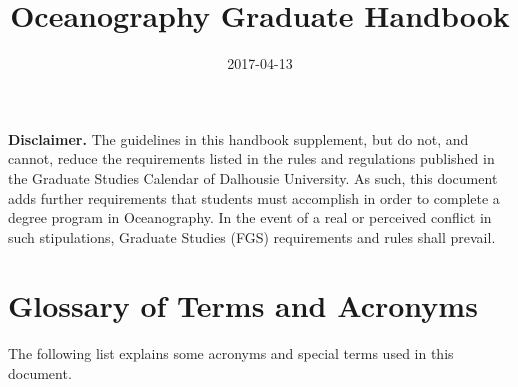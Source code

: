 \documentclass[12pt]{article}
\title{Oceanography Graduate Handbook}
\author{}
\date{2017-04-13}
\newcommand{\FGS}{FGS\xspace}
\begin{document}
\clearpage
\maketitle
\thispagestyle{empty}

\textbf{Disclaimer.} The guidelines in this handbook supplement, but do not,
and cannot, reduce the requirements listed in the rules and regulations
published in the Graduate Studies Calendar of Dalhousie University.  As such,
this document adds further requirements that students must accomplish in order
to complete a degree program in Oceanography.  In the event of a real or
perceived conflict in such stipulations, Graduate Studies (\FGS) requirements
and rules shall prevail.


\newpage

\renewcommand{\baselinestretch}{0.5}\normalsize


\setcounter{tocdepth}{2}
\tableofcontents

\thispagestyle{empty}
\renewcommand{\baselinestretch}{1.0}\normalsize

\setcounter{page}{0}

\section{\label{sec:glossary}Glossary of Terms and Acronyms}

The following list explains some acronyms and special terms used in this
document.
\end{document}
